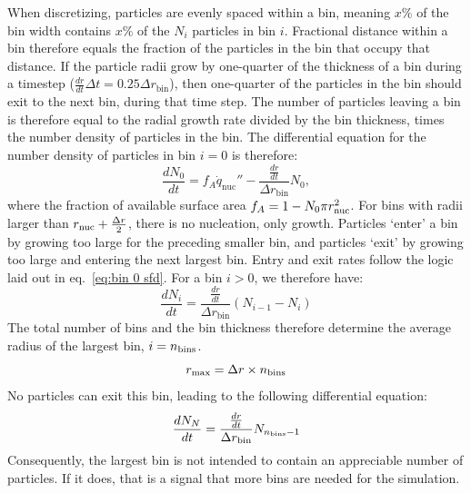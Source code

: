 \documentclass[final,3p,times,twocolumn, 12pt]{elsarticle}
\begin{document}
When discretizing, particles are evenly spaced within a bin, meaning $x\%$ of the bin width contains $x\%$ of the $N_i$ particles in bin $i$. Fractional distance within a bin therefore equals the fraction of the  particles in the bin that occupy that distance. If the particle radii grow by one-quarter of the thickness of a bin during a timestep ($\frac{dr}{dt}\Delta t=0.25\Delta r_\mathrm{bin}$), then one-quarter of the particles in the bin should exit to the next bin, during that time step. The number of particles leaving a bin is therefore equal to the radial growth rate divided by the bin thickness, times the number density of particles in the bin. The differential equation for the number density of particles in bin $i=0$ is therefore:
\begin{equation}
     \frac{dN_0}{dt}=f_A\dot{q}_\mathrm{nuc}'' - \frac{\frac{dr}{dt}}{\Delta r_{\mathrm{bin}}}N_0,
     \label{eq:bin 0 sfd}
\end{equation}
where the fraction of available surface area $f_A = 1 - N_0 \pi r_{\rm nuc}^2$.  For bins with radii larger than $r_{\rm nuc}+\frac{\Delta r}{2}$, there is no nucleation, only growth.  Particles `enter' a bin by growing too large for the preceding smaller bin, and particles  `exit' by growing too large and entering the next largest bin. Entry and exit rates follow the logic laid out in eq.~\ref{eq:bin 0 sfd}. For a bin $i>0$, we therefore have: %
\begin{equation} 
     \frac{dN_i}{dt}=\frac{\frac{dr}{dt}}{\Delta r_{\mathrm{bin}}}\left(N_{i-1} - N_{i}\right)
     \label{eq:bin i sfd}
\end{equation}
The total number of bins and the bin thickness therefore determine the average radius of the largest bin, $i=n_{\rm bins}$. 
\begin{equation}
    r_{\rm max} = \Delta r\times n_{\rm bins}
    \label{eq:r_max}
\end{equation}
No particles can exit this bin, leading to the following differential equation:
\begin{equation}
    \frac{dN_N}{dt}=\frac{\frac{dr}{dt}}{\Delta r_{\mathrm{bin}}}N_{n_{\rm bins}-1}
    \label{eq:bin N sfd}
\end{equation}
Consequently, the largest bin is not intended to contain an appreciable number of particles. If it does, that is a signal that more bins are needed for the simulation.
\end{document}
